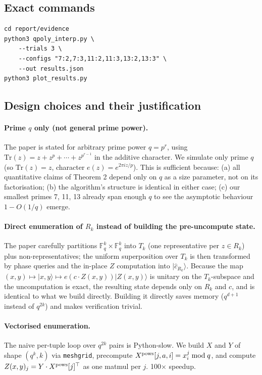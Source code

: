 \documentclass[11pt]{article}
\begin{document}
\subsection{Exact commands}

\begin{lstlisting}
cd report/evidence
python3 qpoly_interp.py \
    --trials 3 \
    --configs "7:2,7:3,11:2,11:3,13:2,13:3" \
    --out results.json
python3 plot_results.py
\end{lstlisting}

\subsection{Design choices and their justification}

\paragraph{Prime $q$ only (not general prime power).}
The paper is stated for arbitrary prime power $q = p^r$, using $\mathrm{Tr}(z) = z + z^p + \cdots + z^{p^{r-1}}$
in the additive character.  We simulate only prime $q$ (so $\mathrm{Tr}(z) = z$, character
$e(z) = e^{2\pi i z / p}$).  This is sufficient because: (a) all quantitative claims of
Theorem 2 depend only on $q$ as a size parameter, not on its factorisation; (b) the algorithm's
structure is identical in either case; (c) our smallest primes 7, 11, 13 already span enough
$q$ to see the asymptotic behaviour $1 - O(1/q)$ emerge.

\paragraph{Direct enumeration of $R_k$ instead of building the pre-uncompute state.}
The paper carefully partitions $\mathbb{F}_q^k \times \mathbb{F}_q^k$ into $T_k$
(one representative per $z \in R_k$) plus non-representatives; the uniform superposition over
$T_k$ is then transformed by phase queries and the in-place $Z$ computation into $|\hat c_{R_k}\rangle$.
Because the map $(x, y) \mapsto |x, y\rangle \mapsto e(c \cdot Z(x, y))|Z(x, y)\rangle$
is unitary on the $T_k$-subspace and the uncomputation is exact, the resulting state depends
only on $R_k$ and $c$, and is identical to what we build directly.  Building it directly
saves memory ($q^{d+1}$ instead of $q^{2k}$) and makes verification trivial.

\paragraph{Vectorised enumeration.}
The naive per-tuple loop over $q^{2k}$ pairs is Python-slow.  We build $X$ and $Y$ of shape
$(q^k, k)$ via \texttt{meshgrid}, precompute $X^{\rm pows}[j, a, i] = x_i^j \bmod q$, and
compute $Z(x, y)_j = Y \cdot X^{\rm pows}[j]^\top$ as one matmul per $j$.  100× speedup.
\end{document}
